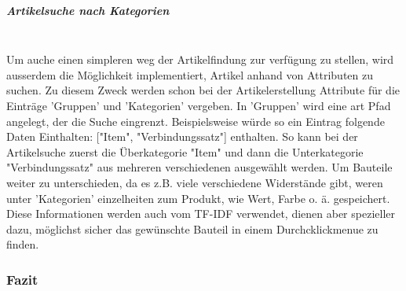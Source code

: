 \subparagraph{Artikelsuche nach Kategorien}\mbox{}\\
Um auche einen simpleren weg der Artikelfindung zur verfügung zu stellen, wird ausserdem die Möglichkeit implementiert, Artikel anhand von Attributen zu suchen. Zu diesem Zweck werden schon bei der Artikelerstellung Attribute für die Einträge 'Gruppen' und 'Kategorien' vergeben. In 'Gruppen' wird eine art Pfad angelegt, der die Suche eingrenzt. Beispielsweise würde so ein Eintrag folgende Daten Einthalten: ["Item", "Verbindungssatz"] enthalten. So kann bei der Artikelsuche zuerst die Überkategorie "Item" und dann die Unterkategorie "Verbindungssatz" aus mehreren verschiedenen ausgewählt werden. Um Bauteile weiter zu unterschieden, da es z.B. viele verschiedene Widerstände gibt, weren unter 'Kategorien' einzelheiten zum Produkt, wie Wert, Farbe o. ä. gespeichert.\\ 
Diese Informationen werden auch vom TF-IDF verwendet, dienen aber spezieller dazu, möglichst sicher das gewünschte Bauteil in einem Durchcklickmenue zu finden.

\subsubsection{Fazit}


